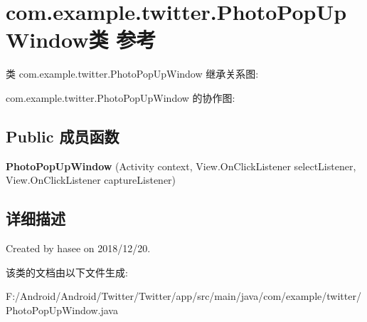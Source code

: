 \hypertarget{classcom_1_1example_1_1twitter_1_1_photo_pop_up_window}{}\section{com.\+example.\+twitter.\+Photo\+Pop\+Up\+Window类 参考}
\label{classcom_1_1example_1_1twitter_1_1_photo_pop_up_window}


类 com.\+example.\+twitter.\+Photo\+Pop\+Up\+Window 继承关系图\+:


com.\+example.\+twitter.\+Photo\+Pop\+Up\+Window 的协作图\+:
\subsection*{Public 成员函数}
\begin{DoxyCompactItemize}
\item 
\mbox{\label{classcom_1_1example_1_1twitter_1_1_photo_pop_up_window_afa479daf75c513698e9a0f45cb152f76}} 
{\bfseries Photo\+Pop\+Up\+Window} (Activity context, View.\+On\+Click\+Listener select\+Listener, View.\+On\+Click\+Listener capture\+Listener)
\end{DoxyCompactItemize}


\subsection{详细描述}
Created by hasee on 2018/12/20. 

该类的文档由以下文件生成\+:\begin{DoxyCompactItemize}
\item 
F\+:/\+Android/\+Android/\+Twitter/\+Twitter/app/src/main/java/com/example/twitter/Photo\+Pop\+Up\+Window.\+java\end{DoxyCompactItemize}
